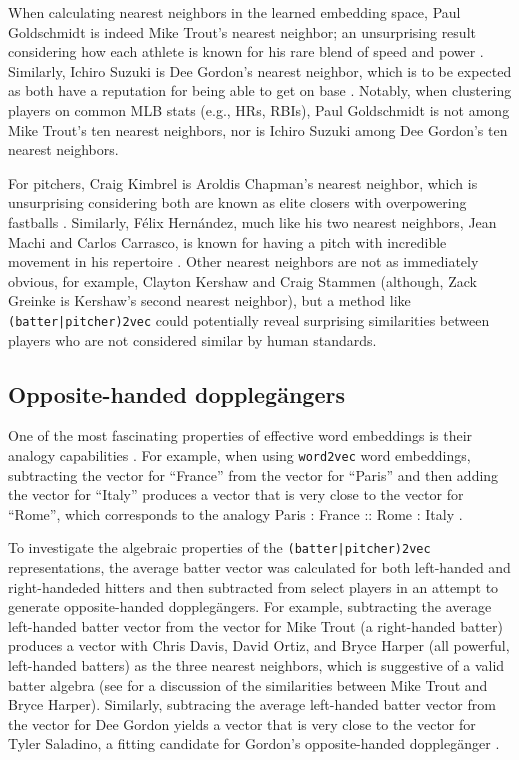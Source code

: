 \documentclass{article}
\begin{document}
When calculating nearest neighbors in the learned embedding space, Paul Goldschmidt is indeed Mike Trout's nearest neighbor; an unsurprising result considering how each athlete is known for his rare blend of speed and power \parencite{Kory2015}. Similarly, Ichiro Suzuki is Dee Gordon's nearest neighbor, which is to be expected as both have a reputation for being able to get on base \parencite{Sullivan2015}. Notably, when clustering players on common MLB stats (e.g., HRs, RBIs), Paul Goldschmidt is not among Mike Trout's ten nearest neighbors, nor is Ichiro Suzuki among Dee Gordon's ten nearest neighbors.

For pitchers, Craig Kimbrel is Aroldis Chapman's nearest neighbor, which is unsurprising considering both are known as elite closers with overpowering fastballs \parencite{Mirsky2016}. Similarly, Félix Hernández, much like his two nearest neighbors, Jean Machi and Carlos Carrasco, is known for having a pitch with incredible movement in his repertoire \parencite{Buchanan2015, Romano2015, Berg2016}. Other nearest neighbors are not as immediately obvious, for example, Clayton Kershaw and Craig Stammen (although, Zack Greinke is Kershaw's second nearest neighbor), but a method like \texttt{(batter|pitcher)2vec} could potentially reveal surprising similarities between players who are not considered similar by human standards.

\subsection{Opposite-handed dopplegängers}

One of the most fascinating properties of effective word embeddings is their analogy capabilities \parencite{Mikolov2013a}. For example, when using \texttt{word2vec} word embeddings, subtracting the vector for ``France'' from the vector for ``Paris'' and then adding the vector for ``Italy'' produces a vector that is very close to the vector for ``Rome'', which corresponds to the analogy Paris : France :: Rome : Italy \parencite{Mikolov2013a}.

To investigate the algebraic properties of the \texttt{(batter|pitcher)2vec} representations, the average batter vector was calculated for both left-handed and right-handeded hitters and then subtracted from select players in an attempt to generate opposite-handed dopplegängers. For example, subtracting the average left-handed batter vector from the vector for Mike Trout (a right-handed batter) produces a vector with Chris Davis, David Ortiz, and Bryce Harper (all powerful, left-handed batters) as the three nearest neighbors, which is suggestive of a valid batter algebra (see \parencite{Spector2016} for a discussion of the similarities between Mike Trout and Bryce Harper). Similarly, subtracing the average left-handed batter vector from the vector for Dee Gordon yields a vector that is very close to the vector for Tyler Saladino, a fitting candidate for Gordon's opposite-handed dopplegänger \parencite{Chamberlain2017}.
\end{document}
